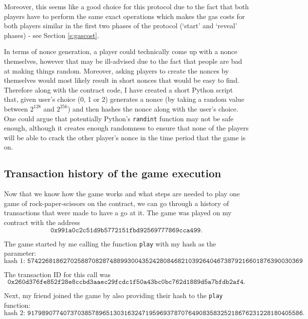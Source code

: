 \documentclass{article}
\begin{document}
    \noindent Moreover, this seems like a good choice for
    this protocol due to the fact that both players have to
    perform the same exact operations which makes the gas
    costs for both players similar in the first two phases
    of the protocol (`start' and `reveal' phases) - see
    Section \ref{s:gascost}.
    \newline

    \noindent In terms of nonce generation, a player could
    technically come up with a nonce themselves, however
    that may be ill-advised due to the fact that people are
    bad at making things random. Moreover, asking players to
    create the nonces by themselves would most likely result
    in short nonces that would be easy to find. Therefore
    along with the contract code, I have created a short
    Python script that, given user's choice (0, 1 or 2)
    generates a nonce (by taking a random value between
    \(2^{128}\) and \(2^{256}\)) and then hashes the nonce
    along with the user's choice. One could argue that
    potentially Python's \verb|randint| function may not be
    safe enough, although it creates enough randomness to
    ensure that none of the players will be able to crack
    the other player's nonce in the time period that the
    game is on.

    \subsection{Transaction history of the game execution}
    Now that we know how the game works and what steps are
    needed to play one game of rock-paper-scissors on the
    contract, we can go through a history of transactions
    that were made to have a go at it. The game was played
    on my contract with the address
    \[
        \texttt{0x991a0c2c51d9b5772151fbd92569777869cca499}.
    \]

    \noindent The game started by me calling the function
    \verb|play| with my hash as the parameter:
    \[
        \text{hash 1: }\texttt{57422681862702588708287488993004352428084682103926404673879216601876390030369}
    \]

    \noindent The transaction ID for this call was 
    \[
        \texttt{0x260d376fe852f28e8ccbd3aaec29fcdc1f50a43bc0bc762d1889d5a7bfdb2af4}.
    \]

    \noindent Next, my friend joined the game by also
    providing their hash to the \verb|play| function:
    \[
        \text{hash 2: }\texttt{91798907740737038578965130316324719596937870764908358325218676231228180405586}.
    \]
\end{document}
